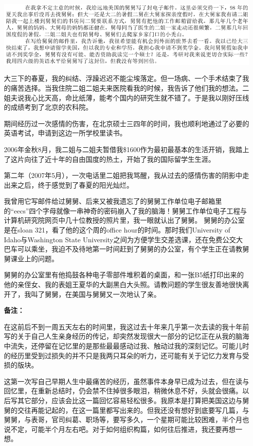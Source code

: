 \documentclass[9pt, b5paper]{article}
\begin{document}
\includegraphics[width=.9\linewidth]{./pic/p1p25.png}

大三下的春夏，我的纠结、浮躁迟迟不能尘埃落定。但一场病、一个手术结束了我的痛苦选择。当我住院二姐二姐夫来医院看我的时候，我告诉了他们我的想法。二姐夫说我心比天高，命比纸薄，能考个国内的研究生就不错了。于是我以刚好压线的成绩考到了北京的农科院。

期间经历过一次感情的伤害，在北京硕士三四年的时间，我也顺利地通过了必要的英语考试，申请到这边一所学校里读书。

2006年金秋8月，我二姐与二姐夫暂借我\$1600作为最初最基本的生活开销，我踏上了这片向往了近十年的自由国度的热土，开始了我的国际留学生生涯。

第二年（2007年5月），一次电话里二姐把我骂醒，我从过去的感情伤害的阴影中走出来之后，终于感觉到了春夏的阳光灿烂。

我曾用它写邮件给过舅舅、后来又被我遗忘了的舅舅工作单位电子邮箱里的“eecs”四个字母就像一串神奇的密码崩入了我的脑海！舅舅工作单位电子工程与计算机研究院网页中几十位教授的照片里，我一眼就认出了舅舅。 舅舅的办公室是在sloan 321，看了他的这个周的office hour的时间。那时我们University of Idaho与Washington State University之间为方便学生交差选课，还在免费公交大巴车可以乘坐，我迫不及待地第一时间赶到了舅舅的办公室，有个学生正在请教舅舅课业上的问题。 

舅舅的办公室里有他捣鼓各种电子零部件堆积着的桌面，和一张B5纸打印出来的他的亲侄女、我的表姐王夏华的大副黑白大头照。请教问题的学生很友善地很快离开了，我叫了舅舅，在美国与舅舅又一次地认了亲。


\textbf{备注：}

在这前后不到一周五天左右的时间里，我这过去十年来几乎第一次去读的我十年前写的关于自己人生亲身经历的传记，却突然发现很大一部分的记忆正在从我的脑海中流失，还停留在记忆里的是那些最最感动过我、触动过我的深刻记忆。可能儿时的经历里受到过损失的并不只是我两只耳朵的听力，还可能有关于记忆力发育与受损的版块。

这第一次写自己早期人生中最痛苦的经历，虽然事件本身早已成为过去，但在读与回忆里，在重新总结时，仍会禁不住掉很多眼泪，稍微休息不好，头就会很痛。以后写其它部分，应该会比这一篇回忆容易轻松很多。我原本是打算把美国这边与舅舅的交往再能记起的，在这一篇里都写出来的。但我还没有想好到底要写几篇，与舅舅，与表哥，官司纠葛、职场等，要写多久，一个星期可能比较困难，半个月也说不定，可能半个月左右吧。对于如何组织构篇，如何往后推进，我还要再想一想。
\end{document}

